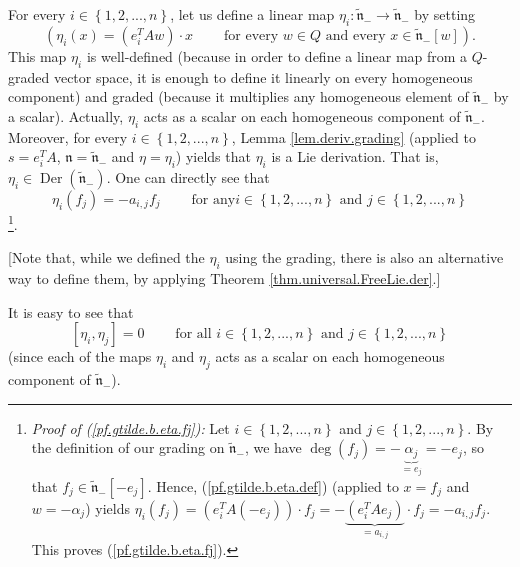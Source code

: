 \documentclass[etingof-lie.tex]{subfiles}
\begin{document}
For every $i\in\left\{  1,2,...,n\right\}  $, let us define a linear map
$\eta_{i}:\widetilde{\mathfrak{n}}_{-}\rightarrow\widetilde{\mathfrak{n}}_{-}$
by setting%
\begin{equation}
\left(  \eta_{i}\left(  x\right)  =\left(  e_{i}^{T}Aw\right)  \cdot
x\ \ \ \ \ \ \ \ \ \ \text{for every }w\in Q\text{ and every }x\in
\widetilde{\mathfrak{n}}_{-}\left[  w\right]  \right)  .
\label{pf.gtilde.b.eta.def}%
\end{equation}
This map $\eta_{i}$ is well-defined (because in order to define a linear map
from a $Q$-graded vector space, it is enough to define it linearly on every
homogeneous component) and graded (because it multiplies any homogeneous
element of $\widetilde{\mathfrak{n}}_{-}$ by a scalar). Actually, $\eta_{i}$
acts as a scalar on each homogeneous component of $\widetilde{\mathfrak{n}%
}_{-}$. Moreover, for every $i\in\left\{  1,2,...,n\right\}  $, Lemma
\ref{lem.deriv.grading} (applied to $s=e_{i}^{T}A$, $\mathfrak{n}%
=\widetilde{\mathfrak{n}}_{-}$ and $\eta=\eta_{i}$) yields that $\eta_{i}$ is
a Lie derivation. That is, $\eta_{i}\in\operatorname*{Der}\left(
\widetilde{\mathfrak{n}}_{-}\right)  $. One can directly see that%
\begin{equation}
\eta_{i}\left(  f_{j}\right)  =-a_{i,j}f_{j}\ \ \ \ \ \ \ \ \ \ \text{for any
}i\in\left\{  1,2,...,n\right\}  \text{ and }j\in\left\{  1,2,...,n\right\}
\label{pf.gtilde.b.eta.fj}%
\end{equation}
\footnote{\textit{Proof of (\ref{pf.gtilde.b.eta.fj}):} Let $i\in\left\{
1,2,...,n\right\}  $ and $j\in\left\{  1,2,...,n\right\}  $. By the definition
of our grading on $\widetilde{\mathfrak{n}}_{-}$, we have $\deg\left(
f_{j}\right)  =-\underbrace{\alpha_{j}}_{=e_{j}}=-e_{j}$, so that $f_{j}%
\in\widetilde{\mathfrak{n}}_{-}\left[  -e_{j}\right]  $. Hence,
(\ref{pf.gtilde.b.eta.def}) (applied to $x=f_{j}$ and $w=-\alpha_{j}$) yields
$\eta_{i}\left(  f_{j}\right)  =\left(  e_{i}^{T}A\left(  -e_{j}\right)
\right)  \cdot f_{j}=-\underbrace{\left(  e_{i}^{T}Ae_{j}\right)  }_{=a_{i,j}%
}\cdot f_{j}=-a_{i,j}f_{j}$. This proves (\ref{pf.gtilde.b.eta.fj}).}.

[Note that, while we defined the $\eta_{i}$ using the grading, there is also
an alternative way to define them, by applying Theorem
\ref{thm.universal.FreeLie.der}.]

It is easy to see that
\begin{equation}
\left[  \eta_{i},\eta_{j}\right]  =0\ \ \ \ \ \ \ \ \ \ \text{for all }%
i\in\left\{  1,2,...,n\right\}  \text{ and }j\in\left\{  1,2,...,n\right\}
\label{pf.gtilde.b.eta.commute}%
\end{equation}
(since each of the maps $\eta_{i}$ and $\eta_{j}$ acts as a scalar on each
homogeneous component of $\widetilde{\mathfrak{n}}_{-}$).
\end{document}
